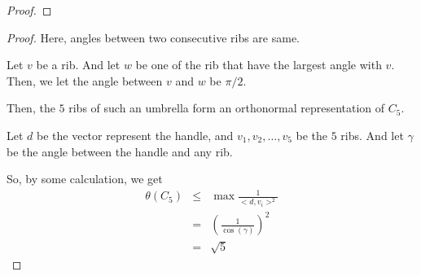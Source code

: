 \begin{frame}
\begin{proof}

      \end{proof}
\end{frame}

\begin{frame}
      \begin{proof}
            Here, angles between two consecutive ribs are same. 
            
            Let $v$ be a rib. And let $w$ be one of the rib that have the largest angle with $v$. Then, we let the angle between $v$ and $w$ be $ \pi/2 $.

            Then, the $5$ ribs of such an umbrella form an orthonormal representation of $C_{5}$.

            Let $d$ be the vector represent the handle, and $v_{1},v_{2},\dots,v_{5}$ be the $5$ ribs. And let $\gamma$ be the angle between the handle and any rib.

            So, by some calculation, we get
            \begin{eqnarray}
                  \theta(C_{5}) &\le& \max \frac{1}{<d,v_{i}>^{2}} \\
                  &=& \left(
                        \frac{1}{\cos(\gamma)}
                  \right)^{2} \\
                  &=& \sqrt{5}
            \end{eqnarray}
      \end{proof}
\end{frame}